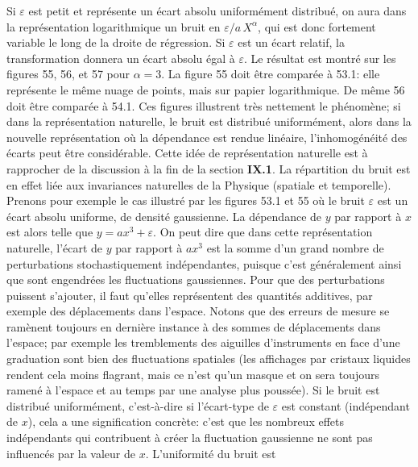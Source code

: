 Si $\varepsilon$ est petit et repr\'esente un \'ecart absolu 
uniform\'ement distribu\'e, on aura dans la repr\'esentation 
logarithmique un bruit en $\varepsilon / a\, X^\alpha$, qui est donc 
fortement variable le long de la droite de r\'egression. Si $\varepsilon$ 
est un \'ecart relatif, la transformation donnera un \'ecart absolu \'egal 
\`a $\varepsilon$. 
\medskip 
Le r\'esultat est montr\'e sur les figures 55, 56, et 57 pour $\alpha = 
3$. La figure 55 doit \^etre compar\'ee \`a 53.1: elle repr\'esente le 
m\^eme nuage de points, mais sur papier logarithmique. De m\^eme 56 
doit \^etre compar\'ee \`a 54.1. 
\medskip 
Ces figures illustrent tr\`es nettement le ph\'enom\`ene; si dans la 
repr\'e\-sen\-ta\-tion {\og naturelle\fg}, le bruit est distribu\'e 
uniform\'ement,  alors dans la nouvelle repr\'esentation o\`u la 
d\'ependance est rendue lin\'eaire, l'inhomog\'en\'eit\'e des \'ecarts 
peut \^etre consid\'erable. Cette id\'ee de repr\'esentation {\og naturelle\fg} 
est \`a rapprocher de la discussion \`a la fin de la section {\bf IX.1}. La 
r\'epartition du bruit est en effet li\'ee aux invariances naturelles de 
la Physique (spatiale et temporelle). Prenons pour exemple le cas 
illustr\'e par les figures 53.1 et 55 o\`u le bruit $\varepsilon$ est un 
\'ecart absolu uniforme, de densit\'e gaussienne. La d\'ependance de $y$ 
par rapport \`a $x$ est alors telle que $y = ax^3 + \varepsilon$. On peut 
dire que dans cette repr\'esentation {\og naturelle\fg}, l'\'ecart de $y$ par 
rapport \`a $ax^3$ est la somme d'un grand nombre de perturbations 
stochastiquement ind\'ependantes, puisque c'est g\'en\'eralement ainsi 
que sont engendr\'ees les fluctuations gaussiennes. Pour que des 
perturbations puissent s'ajouter, il faut qu'elles repr\'esentent des 
quantit\'es additives, par exemple des d\'eplacements dans l'espace. 
Notons que des erreurs de mesure se ram\`enent toujours en derni\`ere 
instance \`a des sommes de d\'eplacements dans l'espace; par exemple
les tremblements des aiguilles d'instruments en face d'une graduation 
sont bien des fluctuations spatiales (les affichages par cristaux
liquides rendent cela moins flagrant, mais ce n'est qu'un masque et on 
sera toujours ramen\'e \`a l'espace et au temps par une analyse plus 
pouss\'ee).  Si le bruit est distribu\'e uniform\'ement, c'est-\`a-dire
si l'\'ecart-type de $\varepsilon$ est constant (ind\'ependant de $x$), 
cela a une signification concr\`ete: c'est que les nombreux effets 
ind\'ependants qui contribuent \`a cr\'eer la fluctuation gaussienne ne 
sont pas influenc\'es par la valeur de $x$. L'uniformit\'e du bruit est 
